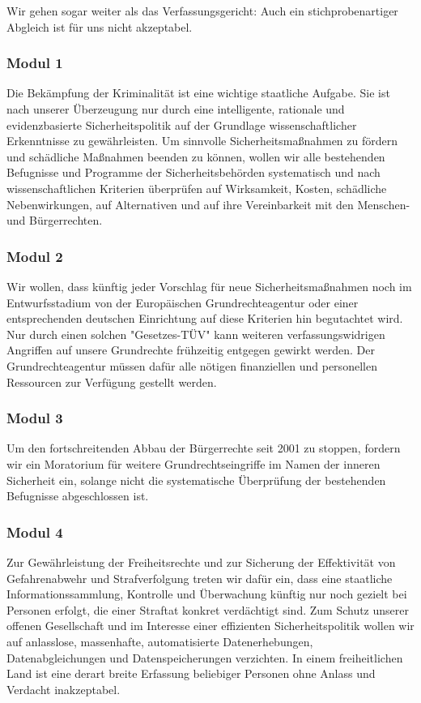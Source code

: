 Wir gehen sogar weiter als das Verfassungsgericht: Auch ein stichprobenartiger Abgleich ist für uns nicht akzeptabel.
 
\subsubsection{Modul 1}
\abstimmung
Die Bekämpfung der Kriminalität ist eine wichtige staatliche Aufgabe. Sie ist nach unserer Überzeugung nur durch eine intelligente, rationale und evidenzbasierte Sicherheitspolitik auf der Grundlage wissenschaftlicher Erkenntnisse zu gewährleisten. Um sinnvolle Sicherheitsmaßnahmen zu fördern und schädliche Maßnahmen beenden zu können, wollen wir alle bestehenden Befugnisse und Programme der Sicherheitsbehörden systematisch und nach wissenschaftlichen Kriterien überprüfen auf Wirksamkeit, Kosten, schädliche Nebenwirkungen, auf Alternativen und auf ihre Vereinbarkeit mit den Menschen- und Bürgerrechten.

\subsubsection{Modul 2}
\abstimmung
Wir wollen, dass künftig jeder Vorschlag für neue Sicherheitsmaßnahmen noch im Entwurfsstadium von der Europäischen Grundrechteagentur oder einer entsprechenden deutschen Einrichtung auf diese Kriterien hin begutachtet wird. Nur durch einen solchen "Gesetzes-TÜV" kann weiteren verfassungswidrigen Angriffen auf unsere Grundrechte frühzeitig entgegen gewirkt werden. Der Grundrechteagentur müssen dafür alle nötigen finanziellen und personellen Ressourcen zur Verfügung gestellt werden.

\subsubsection{Modul 3}
\abstimmung
Um den fortschreitenden Abbau der Bürgerrechte seit 2001 zu stoppen, fordern wir ein Moratorium für weitere Grundrechtseingriffe im Namen der inneren Sicherheit ein, solange nicht die systematische Überprüfung der bestehenden Befugnisse abgeschlossen ist.

\subsubsection{Modul 4}
\abstimmung
Zur Gewährleistung der Freiheitsrechte und zur Sicherung der Effektivität von Gefahrenabwehr und Strafverfolgung treten wir dafür ein, dass eine staatliche Informationssammlung, Kontrolle und Überwachung künftig nur noch gezielt bei Personen erfolgt, die einer Straftat konkret verdächtigt sind. Zum Schutz unserer offenen Gesellschaft und im Interesse einer effizienten Sicherheitspolitik wollen wir auf anlasslose, massenhafte, automatisierte Datenerhebungen, Datenabgleichungen und Datenspeicherungen verzichten. In einem freiheitlichen Land ist eine derart breite Erfassung beliebiger Personen ohne Anlass und Verdacht inakzeptabel.


